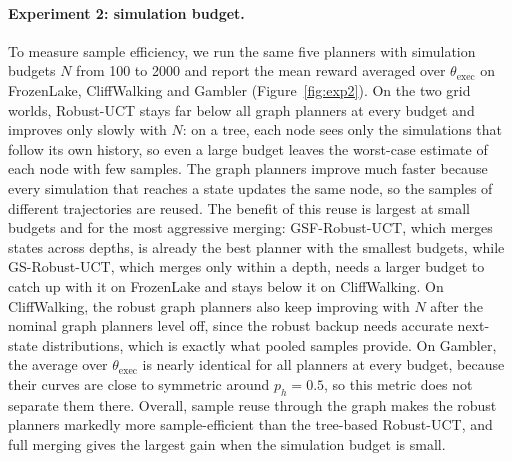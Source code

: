 \paragraph{Experiment 2: simulation budget.}
To measure sample efficiency, we run the same five planners with simulation budgets $N$ from 100 to 2000 and report
the mean reward averaged over $\theta_{\text{exec}}$ on FrozenLake, CliffWalking and Gambler
(Figure~\ref{fig:exp2}). On the two grid worlds, Robust-UCT stays far below all graph planners at every budget and
improves only slowly with $N$: on a tree, each node sees only the simulations that follow its own history, so even a
large budget leaves the worst-case estimate of each node with few samples. The graph planners improve much faster
because every simulation that reaches a state updates the same node, so the samples of different trajectories are
reused. The benefit of this reuse is largest at small budgets and for the most aggressive merging: GSF-Robust-UCT,
which merges states across depths, is already the best planner with the smallest budgets, while GS-Robust-UCT, which
merges only within a depth, needs a larger budget to catch up with it on FrozenLake and stays below it on CliffWalking.
On CliffWalking, the robust graph planners also keep improving with $N$ after the nominal graph planners level off,
since the robust backup needs accurate next-state distributions, which is exactly what pooled samples provide. On Gambler, the average
over $\theta_{\text{exec}}$ is nearly identical for all planners at every budget, because their curves are close to
symmetric around $p_h = 0.5$, so this metric does not separate them there. Overall, sample reuse through the graph
makes the robust planners markedly more sample-efficient than the tree-based Robust-UCT, and full merging gives the
largest gain when the simulation budget is small.
